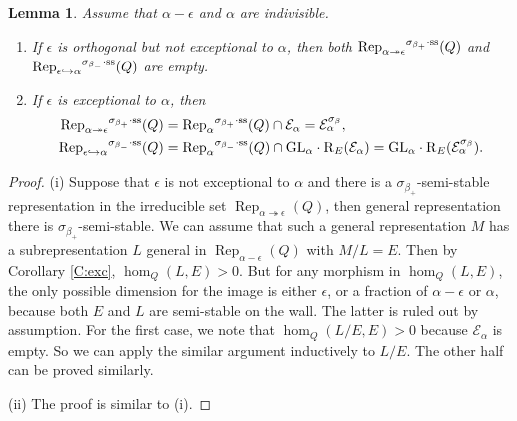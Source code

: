 \documentclass{amsart}
\newtheorem{lemma}[theorem]{Lemma}
\theoremstyle{definition}
\theoremstyle{remark}
\numberwithin{equation}{section}
\begin{document}
\begin{lemma} \label{L:pm} Assume that $\alpha-\epsilon$ and $\alpha$ are indivisible.
\begin{enumerate}
\item[(i)] If $\epsilon$ is orthogonal but not exceptional to $\alpha$, then both ${\operatorname{Rep}}_{\alpha\twoheadrightarrow\epsilon}{^{\sigma_{{\beta_+}}\cdot{\rm {ss}}}}(Q)$ and ${\operatorname{Rep}}_{\epsilon\hookrightarrow\alpha}{^{\sigma_{{\beta_-}}\cdot{\rm {ss}}}}(Q)$ are empty.
\item[(ii)] If $\epsilon$ is exceptional to $\alpha$, then
\begin{align*}{\operatorname{Rep}}_{\alpha\twoheadrightarrow\epsilon}{^{\sigma_{{\beta_+}}\cdot{\rm {ss}}}}(Q) & ={\operatorname{Rep}}_\alpha{^{\sigma_{{\beta_+}}\cdot{\rm {ss}}}}(Q)\cap{\mathcal{{E}}}_\alpha={\mathcal{{E}}}_\alpha^{\sigma_\beta},\\
{\operatorname{Rep}}_{\epsilon\hookrightarrow\alpha}{^{\sigma_{{\beta_-}}\cdot{\rm {ss}}}}(Q) & ={\operatorname{Rep}}_\alpha{^{\sigma_{{\beta_-}}\cdot{\rm {ss}}}}(Q)\cap{\operatorname{GL}}_\alpha\cdot{\operatorname{R}}_E({\mathcal{{E}}}_\alpha)= {\operatorname{GL}}_\alpha\cdot{\operatorname{R}}_E({\mathcal{{E}}}_\alpha^{\sigma_\beta}).
\end{align*}
\end{enumerate}
\end{lemma}

\begin{proof} (i) Suppose that $\epsilon$ is not exceptional to $\alpha$ and there is a $\sigma_{\beta_+}$-semi-stable representation in the irreducible set ${\operatorname{Rep}}_{\alpha\twoheadrightarrow\epsilon}(Q)$, then general representation there is $\sigma_{\beta_+}$-semi-stable. We can assume that such a general representation $M$ has a subrepresentation $L$ general in ${\operatorname{Rep}}_{\alpha-\epsilon}(Q)$ with $M/L=E$. Then by Corollary \ref{C:exc}, $\hom_Q(L,E)>0$. But for any morphism in $\hom_Q(L,E)$, the only possible dimension for the image is either $\epsilon$, or a fraction of $\alpha-\epsilon$ or $\alpha$, because both $E$ and $L$ are semi-stable on the wall. The latter is ruled out by assumption. For the first case, we note that $\hom_Q(L/E,E)>0$ because ${\mathcal{{E}}}_\alpha$ is empty. So we can apply the similar argument inductively to $L/E$. The other half can be proved similarly.

(ii) The proof is similar to (i).
\end{proof}
\end{document}

